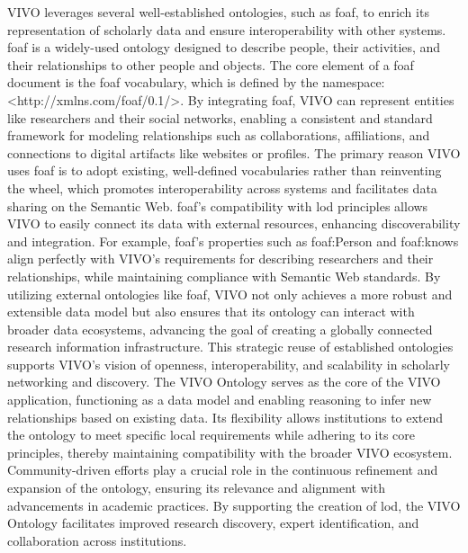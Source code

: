 VIVO leverages several well-established ontologies, such as \gls{foaf}, to enrich its representation of scholarly data and ensure interoperability with other systems.
\gls{foaf} is a widely-used ontology designed to describe people, their activities, and their relationships to other people and objects.
The core element of a \gls{foaf} document is the \gls{foaf} vocabulary, which is defined by the namespace: \textless http://xmlns.com/foaf/0.1/\textgreater.
By integrating \gls{foaf}, VIVO can represent entities like researchers and their social networks, enabling a consistent and standard framework for modeling relationships such as collaborations, affiliations, and connections to digital artifacts like websites or profiles.
The primary reason VIVO uses \gls{foaf} is to adopt existing, well-defined vocabularies rather than reinventing the wheel, which promotes interoperability across systems and facilitates data sharing on the Semantic Web.
\gls{foaf}'s compatibility with \gls{lod} principles allows VIVO to easily connect its data with external resources, enhancing discoverability and integration.
For example, \gls{foaf}'s properties such as foaf:Person and foaf:knows align perfectly with VIVO's requirements for describing researchers and their relationships, while maintaining compliance with Semantic Web standards.
By utilizing external ontologies like \gls{foaf}, VIVO not only achieves a more robust and extensible data model but also ensures that its ontology can interact with broader data ecosystems, advancing the goal of creating a globally connected research information infrastructure.
This strategic reuse of established ontologies supports VIVO's vision of openness, interoperability, and scalability in scholarly networking and discovery.
The VIVO Ontology serves as the core of the VIVO application, functioning as a data model and enabling reasoning to infer new relationships based on existing data.
Its flexibility allows institutions to extend the ontology to meet specific local requirements while adhering to its core principles, thereby maintaining compatibility with the broader VIVO ecosystem.
Community-driven efforts play a crucial role in the continuous refinement and expansion of the ontology, ensuring its relevance and alignment with advancements in academic practices.
By supporting the creation of \gls{lod}, the VIVO Ontology facilitates improved research discovery, expert identification, and collaboration across institutions.
